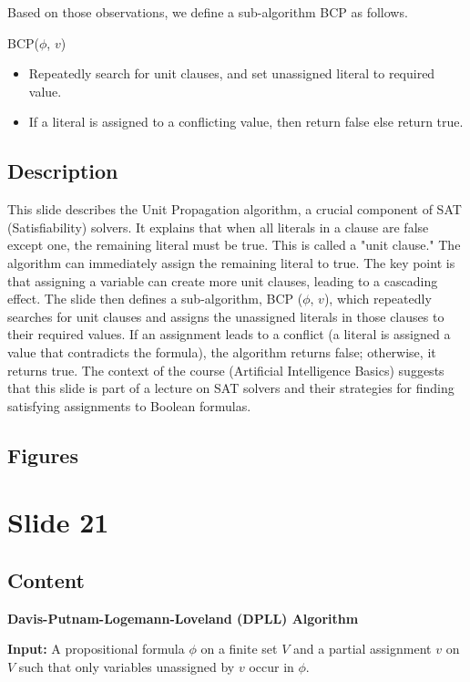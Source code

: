 \documentclass{article}%
\begin{document}
Based on those observations, we define a sub-algorithm BCP as follows.

BCP($\phi$, $v$)
\begin{itemize}
    \item Repeatedly search for unit clauses, and set unassigned literal to required value.
    \item If a literal is assigned to a conflicting value, then return false else return true.
\end{itemize}
%
\subsection{Description}%
This slide describes the Unit Propagation algorithm, a crucial component of SAT (Satisfiability) solvers.  It explains that when all literals in a clause are false except one, the remaining literal must be true. This is called a "unit clause."  The algorithm can immediately assign the remaining literal to true.  The key point is that assigning a variable can create more unit clauses, leading to a cascading effect.  The slide then defines a sub-algorithm, BCP ($\phi$, $v$), which repeatedly searches for unit clauses and assigns the unassigned literals in those clauses to their required values.  If an assignment leads to a conflict (a literal is assigned a value that contradicts the formula), the algorithm returns false; otherwise, it returns true.  The context of the course (Artificial Intelligence Basics) suggests that this slide is part of a lecture on SAT solvers and their strategies for finding satisfying assignments to Boolean formulas.%
\subsection{Figures}%
\begin{figure}[H]%
\centering%
\end{figure}

%
\newpage%
\section{Slide 21}%
\label{sec:Slide21}%
\subsection{Content}%

\textbf{Davis-Putnam-Logemann-Loveland (DPLL) Algorithm}

\textbf{Input:} A propositional formula $\phi$ on a finite set $V$ and a partial assignment $v$ on $V$ such that only variables unassigned by $v$ occur in $\phi$.
\end{document}
